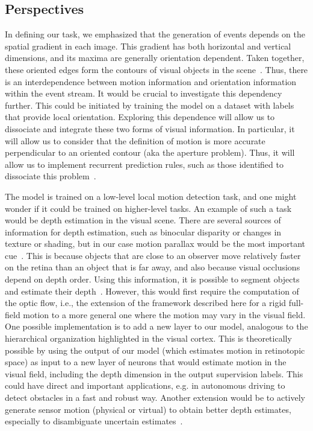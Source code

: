 \documentclass[default]{sn-jnl}%
\theoremstyle{thmstyleone}%
\theoremstyle{thmstyletwo}%
\theoremstyle{thmstylethree}%
\begin{document}
\subsection{Perspectives}
%
In defining our task, we emphasized that the generation of events depends on the spatial gradient in each image. This gradient has both horizontal and vertical dimensions, and its maxima are generally orientation dependent. Taken together, these oriented edges form the contours of visual objects in the scene~\citep{koenderink_representation_1987}. Thus, there is an interdependence between motion information and orientation information within the event stream. It would be crucial to investigate this dependency further. This could be initiated by training the model on a dataset with labels that provide local orientation. Exploring this dependence will allow us to dissociate and integrate these two forms of visual information. In particular, it will allow us to consider that the definition of motion is more accurate perpendicular to an oriented contour (aka the aperture problem). Thus, it will allow us to implement recurrent prediction rules, such as those identified to dissociate this problem~\citep{perrinet_motion-based_2012}.

The model is trained on a low-level local motion detection task, and one might wonder if it could be trained on higher-level tasks. An example of such a task would be depth estimation in the visual scene. There are several sources of information for depth estimation, such as binocular disparity or changes in texture or shading, but in our case motion parallax would be the most important cue~\citep{rogers_motion_1979}. This is because objects that are close to an observer move relatively faster on the retina than an object that is far away, and also because visual occlusions depend on depth order. Using this information, it is possible to segment objects and estimate their depth~\citep{yoonessi_contribution_2011}. However, this would first require the computation of the optic flow, i.e., the extension of the framework described here for a rigid full-field motion to a more general one where the motion may vary in the visual field. One possible implementation is to add a new layer to our model, analogous to the hierarchical organization highlighted in the visual cortex. This is theoretically possible by using the output of our model (which estimates motion in retinotopic space) as input to a new layer of neurons that would estimate motion in the visual field, including the depth dimension in the output supervision labels. This could have direct and important applications, e.g. in autonomous driving to detect obstacles in a fast and robust way. Another extension would be to actively generate sensor motion (physical or virtual) to obtain better depth estimates, especially to disambiguate uncertain estimates~\citep{nawrot_eye_2003}.
\end{document}
